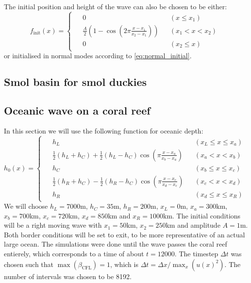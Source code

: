The initial position and height of the wave can also be chosen to be either:
\begin{equation}
    f_\textrm{init}(x) = \begin{cases}
        \begin{aligned}
            &0 &&(x \le x_1)\\
            & {\frac{A}{2} \left( 1 - \cos \left( 2\pi\frac{x-x_1}{x_2-x_1} \right) \right)} &&(x_1 < x < x_2)\\
            &0 &&(x_2 \le x)
        \end{aligned}
    \end{cases}
\end{equation}
or initialised in normal modes according to \autoref{eq:normal_initial}.

\subsection{Smol basin for smol duckies}


\subsection{Oceanic wave on a coral reef}

In this section we will use the following function for oceanic depth:
\begin{equation}
    h_0(x) = \begin{cases}
        \begin{aligned}
            &h_L &&(x_L \le x \le x_a) \\
            &\frac{1}{2}(h_L + h_C) + \frac{1}{2}(h_L - h_C) \cos \left( \pi \frac{x-x_a}{x_b-x_a} \right) &&(x_a < x < x_b) \\
            &h_C &&(x_b \le x \le x_c) \\
            &\frac{1}{2}(h_R + h_C) - \frac{1}{2}(h_R - h_C) \cos \left( \pi \frac{x-x_c}{x_d-x_c} \right) &&(x_c < x < x_d) \\
            &h_R &&(x_d \le x \le x_R)
        \end{aligned}
    \end{cases}
\end{equation}
We will choose \(h_L = 7000\)m, \(h_C = 35\)m, \(h_R = 200\)m, \(x_L = 0\)m, \(x_a = 300\)km, \(x_b = 700\)km, \(x_c = 720\)km, \(x_d = 850\)km and \(x_R = 1000\)km. The initial conditions will be a right moving wave with \(x_1 = 50\)km, \(x_2 = 250\)km and amplitude \(A = 1\)m. Both border conditions will be set to exit, to be more representative of an actual large ocean. The simulations were done until the wave passes the coral reef entierely, which corresponds to a time of about \(t = 12000\). The timestep \(\Delta t\) was chosen such that \(\max(\beta_{\textrm{CFL}}) = 1\), which is \(\Delta t = \Delta x / \max_x(u(x)^2)\). The number of intervals was chosen to be 8192.

